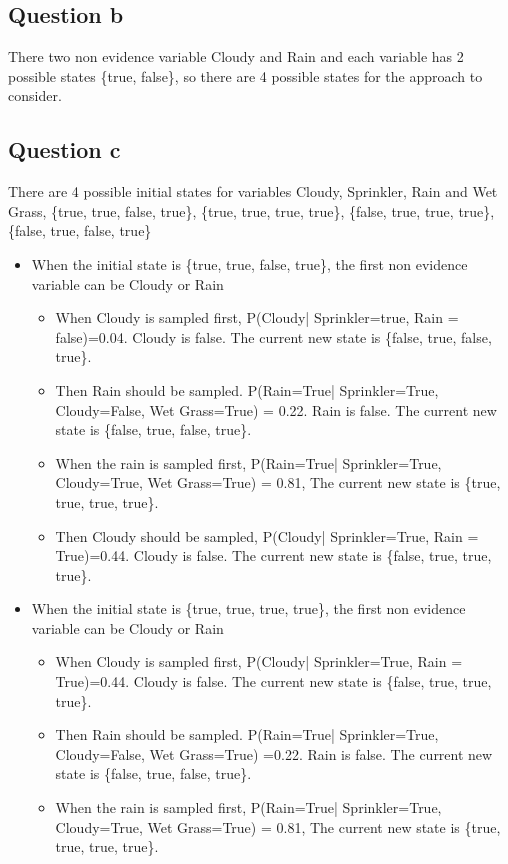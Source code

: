 \documentclass{article}
\begin{document}
\subsection{Question b}
There two non evidence variable Cloudy and Rain and each variable has 2 possible states \{true, false\}, so  there are 4 possible states for the approach to consider.

\subsection{Question c} 
There are 4 possible initial states for variables  Cloudy, Sprinkler, Rain and Wet Grass, \{true, true, false, true\},  \{true, true, true, true\},  \{false, true, true, true\}, \{false, true, false, true\}
\begin{itemize}
\item When the initial state is \{true, true, false, true\}, the first non evidence variable can be Cloudy or Rain
\begin{itemize}
\item When Cloudy is sampled first, P(Cloudy| Sprinkler=true, Rain = false)=0.04. Cloudy is false. The current new state is  \{false, true, false, true\}.  
\item Then Rain should be sampled. P(Rain=True| Sprinkler=True, Cloudy=False, Wet Grass=True) = 0.22. Rain is false. The current new state is  \{false, true, false, true\}.
\item When the rain is sampled first, P(Rain=True| Sprinkler=True, Cloudy=True, Wet Grass=True) = 0.81, The current new state is  \{true, true, true, true\}. 
\item Then Cloudy should be sampled,  P(Cloudy| Sprinkler=True, Rain = True)=0.44. Cloudy is false. The current new state is  \{false, true, true, true\}.
\end{itemize}
\item When the initial state is \{true, true, true, true\}, the first non evidence variable can be Cloudy or Rain
\begin{itemize}
\item When Cloudy is sampled first, P(Cloudy| Sprinkler=True, Rain = True)=0.44. Cloudy is false. The current new state is  \{false, true, true, true\}.  
\item Then Rain should be sampled. P(Rain=True| Sprinkler=True, Cloudy=False, Wet Grass=True) =0.22. Rain is false. The current new state is  \{false, true, false, true\}.
\item When the rain is sampled first, P(Rain=True| Sprinkler=True, Cloudy=True, Wet Grass=True) = 0.81, The current new state is  \{true, true, true, true\}. 

\end{itemize}
\end{itemize}
\end{document}
